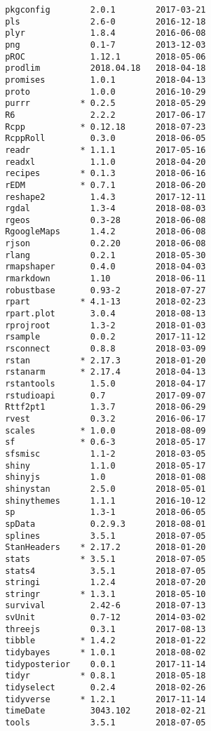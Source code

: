 \documentclass[twoside,12pt,final]{ucthesis-CA2012}
\begin{document}
\begin{ucmainmatter}
\begin{verbatim}
 pkgconfig        2.0.1        2017-03-21
 pls              2.6-0        2016-12-18
 plyr             1.8.4        2016-06-08
 png              0.1-7        2013-12-03
 pROC             1.12.1       2018-05-06
 prodlim          2018.04.18   2018-04-18
 promises         1.0.1        2018-04-13
 proto            1.0.0        2016-10-29
 purrr          * 0.2.5        2018-05-29
 R6               2.2.2        2017-06-17
 Rcpp           * 0.12.18      2018-07-23
 RcppRoll         0.3.0        2018-06-05
 readr          * 1.1.1        2017-05-16
 readxl           1.1.0        2018-04-20
 recipes        * 0.1.3        2018-06-16
 rEDM           * 0.7.1        2018-06-20
 reshape2         1.4.3        2017-12-11
 rgdal            1.3-4        2018-08-03
 rgeos            0.3-28       2018-06-08
 RgoogleMaps      1.4.2        2018-06-08
 rjson            0.2.20       2018-06-08
 rlang            0.2.1        2018-05-30
 rmapshaper       0.4.0        2018-04-03
 rmarkdown        1.10         2018-06-11
 robustbase       0.93-2       2018-07-27
 rpart          * 4.1-13       2018-02-23
 rpart.plot       3.0.4        2018-08-13
 rprojroot        1.3-2        2018-01-03
 rsample          0.0.2        2017-11-12
 rsconnect        0.8.8        2018-03-09
 rstan          * 2.17.3       2018-01-20
 rstanarm       * 2.17.4       2018-04-13
 rstantools       1.5.0        2018-04-17
 rstudioapi       0.7          2017-09-07
 Rttf2pt1         1.3.7        2018-06-29
 rvest            0.3.2        2016-06-17
 scales         * 1.0.0        2018-08-09
 sf             * 0.6-3        2018-05-17
 sfsmisc          1.1-2        2018-03-05
 shiny            1.1.0        2018-05-17
 shinyjs          1.0          2018-01-08
 shinystan        2.5.0        2018-05-01
 shinythemes      1.1.1        2016-10-12
 sp               1.3-1        2018-06-05
 spData           0.2.9.3      2018-08-01
 splines          3.5.1        2018-07-05
 StanHeaders    * 2.17.2       2018-01-20
 stats          * 3.5.1        2018-07-05
 stats4           3.5.1        2018-07-05
 stringi          1.2.4        2018-07-20
 stringr        * 1.3.1        2018-05-10
 survival         2.42-6       2018-07-13
 svUnit           0.7-12       2014-03-02
 threejs          0.3.1        2017-08-13
 tibble         * 1.4.2        2018-01-22
 tidybayes      * 1.0.1        2018-08-02
 tidyposterior    0.0.1        2017-11-14
 tidyr          * 0.8.1        2018-05-18
 tidyselect       0.2.4        2018-02-26
 tidyverse      * 1.2.1        2017-11-14
 timeDate         3043.102     2018-02-21
 tools            3.5.1        2018-07-05

\end{verbatim}
\end{ucmainmatter}
\end{document}
